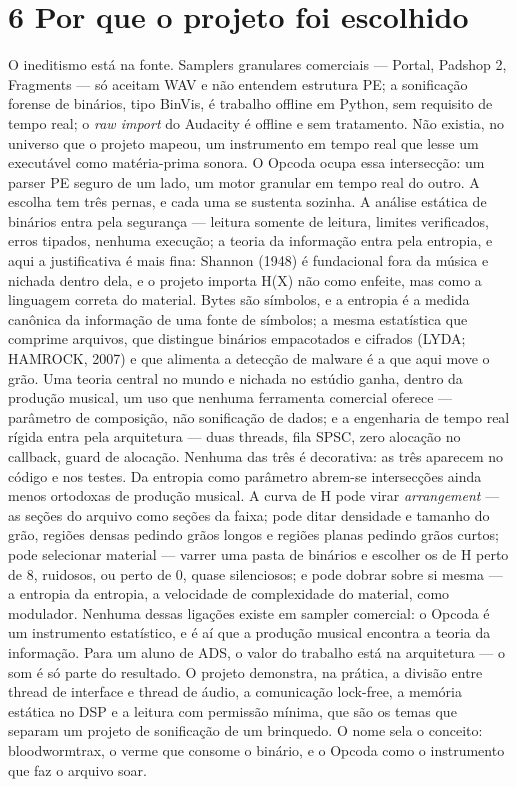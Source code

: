 \documentclass[11pt,a4paper]{article}
\begin{document}
\section*{6 Por que o projeto foi escolhido}
O ineditismo está na fonte. Samplers granulares comerciais --- Portal, Padshop 2, Fragments --- só aceitam WAV e não entendem estrutura PE; a sonificação forense de binários, tipo BinVis, é trabalho offline em Python, sem requisito de tempo real; o \emph{raw import} do Audacity é offline e sem tratamento. Não existia, no universo que o projeto mapeou, um instrumento em tempo real que lesse um executável como matéria-prima sonora. O Opcoda ocupa essa intersecção: um parser PE seguro de um lado, um motor granular em tempo real do outro. A escolha tem três pernas, e cada uma se sustenta sozinha. A análise estática de binários entra pela segurança --- leitura somente de leitura, limites verificados, erros tipados, nenhuma execução; a teoria da informação entra pela entropia, e aqui a justificativa é mais fina: Shannon (1948) é fundacional fora da música e nichada dentro dela, e o projeto importa H(X) não como enfeite, mas como a linguagem correta do material. Bytes são símbolos, e a entropia é a medida canônica da informação de uma fonte de símbolos; a mesma estatística que comprime arquivos, que distingue binários empacotados e cifrados (LYDA; HAMROCK, 2007) e que alimenta a detecção de malware é a que aqui move o grão. Uma teoria central no mundo e nichada no estúdio ganha, dentro da produção musical, um uso que nenhuma ferramenta comercial oferece --- parâmetro de composição, não sonificação de dados; e a engenharia de tempo real rígida entra pela arquitetura --- duas threads, fila SPSC, zero alocação no callback, guard de alocação. Nenhuma das três é decorativa: as três aparecem no código e nos testes. Da entropia como parâmetro abrem-se intersecções ainda menos ortodoxas de produção musical. A curva de H pode virar \emph{arrangement} --- as seções do arquivo como seções da faixa; pode ditar densidade e tamanho do grão, regiões densas pedindo grãos longos e regiões planas pedindo grãos curtos; pode selecionar material --- varrer uma pasta de binários e escolher os de H perto de 8, ruidosos, ou perto de 0, quase silenciosos; e pode dobrar sobre si mesma --- a entropia da entropia, a velocidade de complexidade do material, como modulador. Nenhuma dessas ligações existe em sampler comercial: o Opcoda é um instrumento estatístico, e é aí que a produção musical encontra a teoria da informação. Para um aluno de ADS, o valor do trabalho está na arquitetura --- o som é só parte do resultado. O projeto demonstra, na prática, a divisão entre thread de interface e thread de áudio, a comunicação lock-free, a memória estática no DSP e a leitura com permissão mínima, que são os temas que separam um projeto de sonificação de um brinquedo. O nome sela o conceito: bloodwormtrax, o verme que consome o binário, e o Opcoda como o instrumento que faz o arquivo soar.
\end{document}
